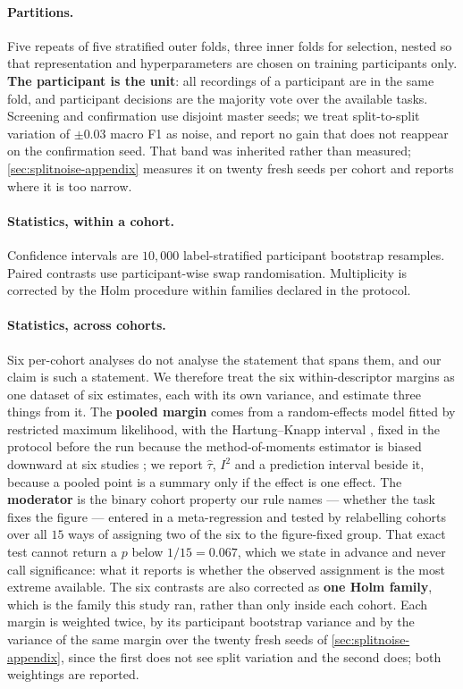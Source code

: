\documentclass[10pt,a4paper]{article}
\begin{document}
\paragraph{Partitions.} Five repeats of five stratified outer folds, three inner folds for
selection, nested so that representation and hyperparameters are chosen on training participants
only. \textbf{The participant is the unit}: all recordings of a participant are in the same fold,
and participant decisions are the majority vote over the available tasks. Screening and
confirmation use disjoint master seeds; we treat split-to-split variation of $\pm 0.03$ macro F1 as
noise, and report no gain that does not reappear on the confirmation seed. That band was inherited
rather than measured; \cref{sec:splitnoise-appendix} measures it on twenty fresh seeds per cohort
and reports where it is too narrow.

\paragraph{Statistics, within a cohort.} Confidence intervals are $10{,}000$ label-stratified
participant bootstrap resamples. Paired contrasts use participant-wise swap randomisation.
Multiplicity is corrected by the Holm procedure \citep{holm1979} within families declared in the
protocol.

\paragraph{Statistics, across cohorts.} Six per-cohort analyses do not analyse the statement that
spans them, and our claim is such a statement. We therefore treat the six within-descriptor margins
as one dataset of six estimates, each with its own variance, and estimate three things from it. The
\textbf{pooled margin} comes from a random-effects model fitted by restricted maximum likelihood,
with the Hartung--Knapp interval \citep{hartung2001}, fixed in the protocol before the
run because the method-of-moments estimator is biased downward at six studies
\citep{viechtbauer2005}; we report $\hat\tau$, $I^2$ \citep{higgins2002} and a prediction interval
beside it, because a pooled point is a summary only if the effect is one effect. The
\textbf{moderator} is the binary cohort property our rule names --- whether the task fixes the
figure --- entered in a meta-regression and tested by relabelling cohorts over all $15$ ways of
assigning two of the six to the figure-fixed group. That exact test cannot return a $p$ below
$1/15 = 0.067$, which we state in advance and never call significance: what it reports is whether
the observed assignment is the most extreme available. The six contrasts are also corrected as
\textbf{one Holm family}, which is the family this study ran, rather than only inside each cohort.
Each margin is weighted twice, by its participant bootstrap variance and by the variance of the same
margin over the twenty fresh seeds of \cref{sec:splitnoise-appendix}, since the first does not see
split variation and the second does; both weightings are reported.
\end{document}
